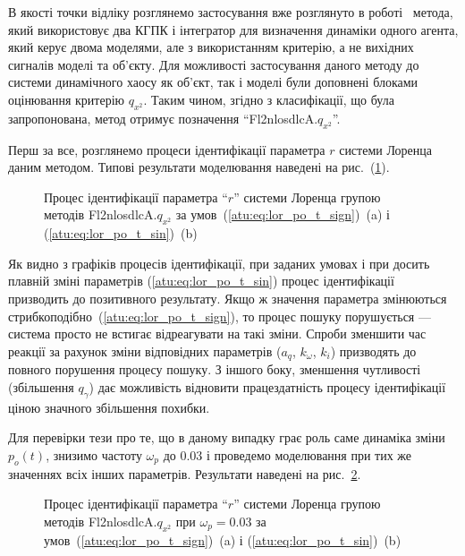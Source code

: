 В якості точки відліку розглянемо застосування вже розглянуто
в роботі~\cite{atu_phd_thesis}
метода, який використовує два КГПК і інтегратор для визначення динаміки одного агента,
який керує двома моделями, але з використанням критерію, а не вихідних сигналів моделі та об'єкту.
Для можливості застосування даного методу до системи
динамічного хаосу як об'єкт, так і моделі були доповнені блоками
оцінювання критерію
$q_{x^2}$. Таким чином, згідно з класифікації, що була запропонована, метод
отримує позначення
``Fl2nlosdlcA.$q_{x^2}$''.

Перш за все, розглянемо процеси ідентифікації параметра
$r$ системи Лоренца даним методом. Типові результати моделювання
наведені на рис.~(\ref{atu:f:lor_id_Fl2nlosdlcA_wp009}).

\begin{figure}[htb!]
  \caption{Процес ідентифікації параметра ``$r$'' системи Лоренца групою методів Fl2nlosdlcA.$q_{x^2} $ за умов~(\ref{atu:eq:lor_po_t_sign})~(a) і (\ref{atu:eq:lor_po_t_sin})~(b)}
\label{atu:f:lor_id_Fl2nlosdlcA_wp009}
\end{figure}

Як видно з графіків процесів ідентифікації, при заданих умовах
і при досить плавній зміні параметрів (\ref{atu:eq:lor_po_t_sin}) процес
ідентифікації призводить до позитивного результату. Якщо ж
значення параметра змінюються стрибкоподібно~(\ref{atu:eq:lor_po_t_sign}),
то процес пошуку порушується --- система просто не встигає
відреагувати на такі зміни. Спроби зменшити час реакції за
рахунок зміни відповідних параметрів
($a_q$, $k_\omega$, $k_i$)
призводять до повного порушення процесу пошуку. З іншого
боку, зменшення чутливості (збільшення $q_\gamma$) дає можливість відновити працездатність процесу
ідентифікації ціною значного збільшення похибки.

Для перевірки тези про те, що в даному випадку грає роль саме
динаміка зміни
$p_o(t)$, знизимо частоту
$\omega_p$ до
$0.03$ і проведемо моделювання при тих же значеннях всіх інших
параметрів. Результати наведені на рис.~\ref{atu:f:lor_id_Fl2nlosdlcA_003}.

\begin{figure}[htb!]
  \caption{Процес ідентифікації параметра ``$r$'' системи Лоренца групою методів Fl2nlosdlcA.$q_{x^2} $ при $ \omega_p = 0.03 $ за умов~(\ref{atu:eq:lor_po_t_sign})~(a) і (\ref{atu:eq:lor_po_t_sin})~(b)}
  \label{atu:f:lor_id_Fl2nlosdlcA_003}
\end{figure}

